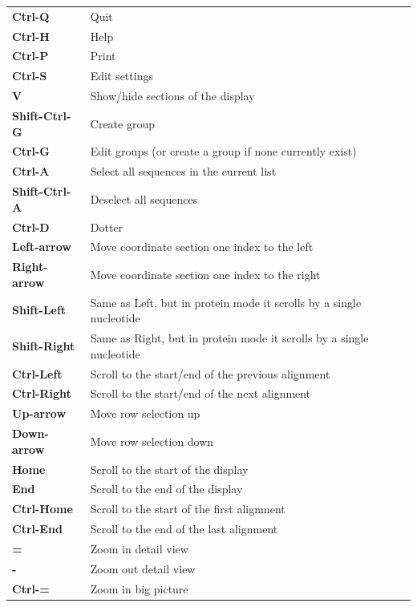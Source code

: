 \documentclass[letterpaper]{article}
\begin{document}
\begin{flushleft}
\tablehead{}
\begin{supertabular}{p{2.222cm}p{11.729cm}}
\bfseries Ctrl-Q &
 Quit\\
\bfseries Ctrl-H &
 Help\\
\bfseries Ctrl-P &
 Print\\
\bfseries Ctrl-S &
 Edit settings\\
\bfseries V &
 Show/hide sections of the display\\
\bfseries Shift-Ctrl-G &
 Create group\\
\bfseries Ctrl-G &
 Edit groups (or create a group if none
currently exist)\\
\bfseries Ctrl-A &
 Select all sequences in the current list\\
\bfseries Shift-Ctrl-A &
 Deselect all sequences\\
\bfseries Ctrl-D &
 Dotter\\
\bfseries Left-arrow &
 Move coordinate section one index to the
left\footnotemark[2]\\
\bfseries Right-arrow &
 Move coordinate section one index to the
right\footnotemark[2] \\
\bfseries Shift-Left &
 Same as Left, but in protein mode it scrolls by
a single nucleotide\\
\bfseries Shift-Right &
 Same as Right, but in protein mode it scrolls
by a single nucleotide\\
\bfseries Ctrl-Left &
 Scroll to the start/end of the previous
alignment\footnotemark[3]\\
\bfseries Ctrl-Right &
 Scroll to the start/end of the next
alignment\footnotemark[3] \\
\bfseries Up-arrow &
 Move row selection up \\
\bfseries Down-arrow &
 Move row selection down \ \\
\bfseries Home &
 Scroll to the start of the display\\
\bfseries End &
 Scroll to the end of the display\\
\bfseries Ctrl-Home &
 Scroll to the start of the first
alignment\footnotemark[3] \\
\bfseries Ctrl-End &
 Scroll to the end of the last
alignment\footnotemark[3] \\
\bfseries = &
 Zoom in detail view\\
\bfseries {}- &
 Zoom out detail view\\
\bfseries Ctrl-= &
 Zoom in big picture\\

\end{supertabular}
\end{flushleft}
\end{document}
